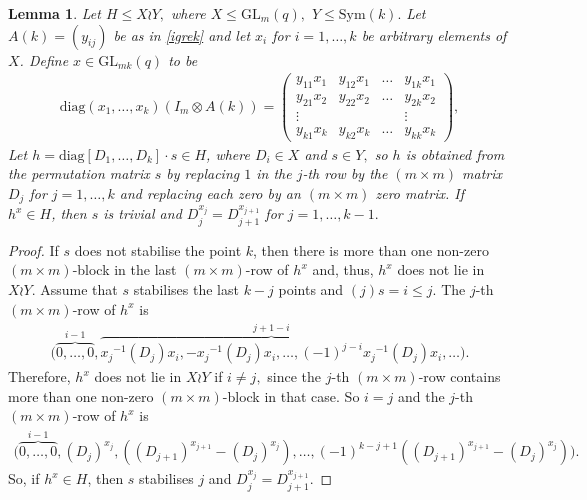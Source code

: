 \documentclass[a4paper,reqno,11pt]{amsart}
\newtheorem{Lem}[Th]{Lemma}
\theoremstyle{definition}
\theoremstyle{remark}
\numberwithin{equation}{section}
\newcommand{\Sym}{\mathrm{Sym}}
\newcommand{\diag}{\mathrm{diag}}
\newcommand{\GL}{{\mathrm{GL}}}
\begin{document}
\begin{Lem}\label{igrekl}
Let $H \le X \wr Y,$ where $X \le \GL_m(q),$ $Y \le \Sym(k).$  
Let $A(k)=(y_{ij})$ be as in \eqref{igrek} and let $x_i$ for $i =1, \ldots, k$ be arbitrary elements of $X$.
Define $x \in \GL_{mk}(q)$ to be
\begin{gather*}
\diag(x_1, \ldots, x_k) (I_m \otimes A(k))=
\begin{pmatrix}
y_{11}x_1      & y_{12}x_1      & \ldots     & y_{1k}x_1            \\
y_{21}x_2      &  y_{22}x_2     & \ldots     & y_{2k}x_2             \\
\vdots      &             &            & \vdots               \\
y_{k 1}x_{k}   & y_{k 2}x_{k}   &  \ldots    & y_{k k}x_{k}               
\end{pmatrix},
\end{gather*} 
 Let $h=\diag[D_1, \ldots, D_k] \cdot s  \in H$, where $D_i \in X$ and $s \in Y,$ so $h$ is obtained from the permutation matrix $s$ by replacing $1$ in the $j$-th row by the $(m \times m)$ matrix $D_j$ for $j =1, \ldots, k$ and replacing each zero by an $(m\times m)$ zero matrix. 
If $h^x \in H$, then $s$ is trivial and $D_j^{x_j}=D_{j+1}^{x_{j+1}}$ for $j=1, \ldots, k-1.$ 
\end{Lem}
\begin{proof}
   If $s$ does not stabilise the point $k$, then there is more than one non-zero $(m \times m)$-block in the last $(m \times m)$-row of $h^{x}$ and, thus, $h^{x}$ does not lie in   $ X \wr Y.$
Assume that $s$ stabilises the last ${k-j}$ points and $(j)s=i \le j.$ The  $j$-th $(m \times m)$-row of $h^{x}$ is 
\begin{equation*}	
\begin{split}
\bigl( \overbrace{0, \ldots, 0}^{i-1},  \overbrace{{x_j}^{-1}(D_{j}){x_i},-{x_j}^{-1}(D_{j}){x_i},  \ldots,(-1)^{j-i} {x_j}^{-1}(D_{j}){x_i}}^{j+1-i}, \ldots \bigr).
\end{split}
\end{equation*}
Therefore, $h^x$ does not lie in $X \wr Y$ if $i \ne j,$ since the $j$-th  $(m \times m)$-row contains more than one non-zero $(m \times m)$-block in that case. So $i=j$ and the  $j$-th $(m \times m)$-row of $h^{x}$ is
\begin{equation*}
\begin{split}
\bigl( \overbrace{0, \ldots, 0}^{i-1},  (D_{j})^{x_j},   
( ( D_{j+1})^{x_{j+1}} -(D_{j})^{x_j}  ) ,  \ldots, (-1)^{k-j+1}((D_{j+1})^{x_{j+1}} - (D_{j})^{x_j}  ) \bigr).
\end{split}
\end{equation*}
 So, if $h^x \in H$, then $s$ stabilises $j$ and $D_{j}^{{x_j}}=D_{j+1}^{x_{j+1}}.$
\end{proof}
\end{document}
